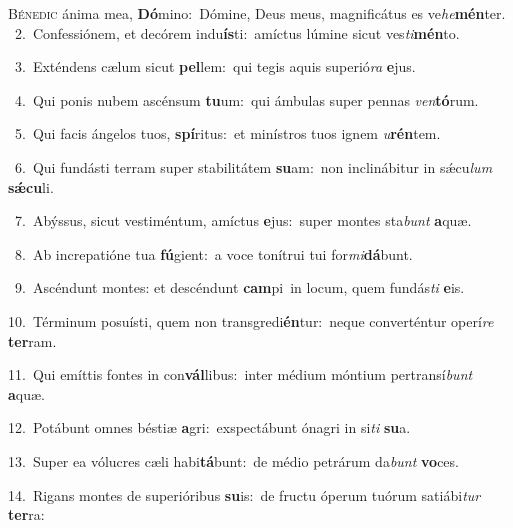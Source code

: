 \lettrine{\initial\textcolor{\initialcolor}{B}}{énedic} ánima mea, \textbf{Dó}\-mino:~\star Dómine, Deus meus, magnificátus es ve\-\textit{he}\-\textbf{mén}ter.\\
{\numbfont\textcolor{\numbcolor}{~2.}}~Confessiónem, et decórem indu\-\textbf{ís}\-ti:~\star amíctus lúmine sicut ves\-\textit{ti}\-\textbf{mén}to.\par
{\numbfont\textcolor{\numbcolor}{~3.}}~Exténdens cælum sicut \textbf{pel}\-lem:~\star qui tegis aquis superió\textit{ra} \textbf{e}\-jus.\par
{\numbfont\textcolor{\numbcolor}{~4.}}~Qui ponis nubem ascénsum \textbf{tu}\-um:~\star qui ámbulas super pennas \textit{ven}\-\textbf{tó}rum.\par
{\numbfont\textcolor{\numbcolor}{~5.}}~Qui facis ángelos tuos, \textbf{spí}\-ritus:~\star et minístros tuos ignem \textit{u}\-\textbf{rén}tem.\par
{\numbfont\textcolor{\numbcolor}{~6.}}~Qui fundásti terram super stabilitátem \textbf{su}\-am:~\star non inclinábitur in sǽcu\textit{lum} \textbf{sǽ}\-\textbf{cu}li.\par
{\numbfont\textcolor{\numbcolor}{~7.}}~Abýssus, sicut vestiméntum, amíctus \textbf{e}\-jus:~\star super montes sta\textit{bunt} \textbf{a}\-quæ.\par
{\numbfont\textcolor{\numbcolor}{~8.}}~Ab increpatióne tua \textbf{fú}\-gient:~\star a voce tonítrui tui for\-\textit{mi}\-\textbf{dá}bunt.\par
{\numbfont\textcolor{\numbcolor}{~9.}}~Ascéndunt montes: et descéndunt \textbf{cam}\-pi~\star in locum, quem fundás\textit{ti} \textbf{e}\-is.\par
{\numbfont\textcolor{\numbcolor}{10.}}~Términum posuísti, quem non transgredi\-\textbf{én}\-tur:~\star neque converténtur operí\textit{re} \textbf{ter}\-ram.\par
{\numbfont\textcolor{\numbcolor}{11.}}~Qui emíttis fontes in con\-\textbf{vál}\-libus:~\star inter médium móntium pertransí\textit{bunt} \textbf{a}\-quæ.\par
{\numbfont\textcolor{\numbcolor}{12.}}~Potábunt omnes béstiæ \textbf{a}\-gri:~\star exspectábunt ónagri in si\textit{ti} \textbf{su}\-a.\par
{\numbfont\textcolor{\numbcolor}{13.}}~Super ea vólucres cæli habi\-\textbf{tá}\-bunt:~\star de médio petrárum da\textit{bunt} \textbf{vo}\-ces.\par
{\numbfont\textcolor{\numbcolor}{14.}}~Rigans montes de superióribus \textbf{su}\-is:~\star de fructu óperum tuórum satiábi\textit{tur} \textbf{ter}\-ra:\par
